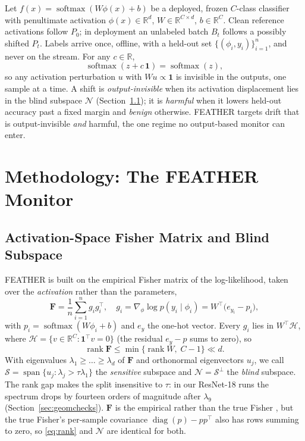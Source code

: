 \documentclass[conference]{IEEEtran}
\newcommand{\R}{\mathbb{R}}
\newcommand{\F}{\mathbf{F}}
\newcommand{\act}{\phi}
\DeclareMathOperator{\rank}{rank}
\DeclareMathOperator{\diag}{diag}
\DeclareMathOperator{\spn}{span}
\DeclareMathOperator*{\softmax}{softmax}
\begin{document}
Let $f(x) = \softmax(W\act(x) + b)$ be a deployed, frozen $C$-class
classifier with penultimate activation $\act(x) \in \R^d$,
$W \in \R^{C \times d}$, $b \in \R^C$. Clean reference activations follow
$P_0$; in deployment an unlabeled batch $B_t$ follows a possibly shifted
$P_t$. Labels arrive once, offline, with a held-out set
$\{(\act_i, y_i)\}_{i=1}^{n}$, and never on the stream. For any $c \in \R$,
\begin{equation}
  \softmax(z + c\,\mathbf{1}) = \softmax(z),
  \label{eq:invariance}
\end{equation}
so any activation perturbation $u$ with $Wu \propto \mathbf{1}$ is invisible
in the outputs, one sample at a time. A shift is \emph{output-invisible} when
its activation displacement lies in the blind subspace $\mathcal{N}$
(Section~\ref{sec:blind}); it is \emph{harmful} when it lowers held-out
accuracy past a fixed margin and \emph{benign} otherwise. FEATHER targets drift
that is output-invisible \emph{and} harmful, the one regime no output-based
monitor can enter.

\section{Methodology: The FEATHER Monitor}
\label{sec:method}

\subsection{Activation-Space Fisher Matrix and Blind Subspace}
\label{sec:blind}

FEATHER is built on the empirical Fisher matrix of the log-likelihood, taken
over the \emph{activation} rather than the parameters,
\begin{equation}
  \F = \frac{1}{n}\sum_{i=1}^{n} g_i g_i^\top,
  \quad
  g_i = \nabla_{\act}\log p(y_i \mid \act_i) = W^\top\!\big(e_{y_i} - p_i\big),
  \label{eq:fisher}
\end{equation}
with $p_i = \softmax(W\act_i + b)$ and $e_y$ the one-hot vector. Every $g_i$
lies in $W^\top\!\mathcal{H}$, where
$\mathcal{H} = \{v \in \R^C : \mathbf{1}^\top v = 0\}$ (the residual
$e_y - p$ sums to zero), so
\begin{equation}
  \rank \F \le \min\{\rank W,\; C-1\} \ll d .
  \label{eq:rank}
\end{equation}
With eigenvalues $\lambda_1 \ge \dots \ge \lambda_d$ of $\F$ and orthonormal
eigenvectors $u_j$, we call $\mathcal{S} = \spn\{u_j : \lambda_j >
\tau\lambda_1\}$ the \emph{sensitive} subspace and $\mathcal{N} =
\mathcal{S}^\perp$ the \emph{blind} subspace. The rank gap makes the split
insensitive to $\tau$: in our ResNet-18 runs the spectrum drops by fourteen
orders of magnitude after $\lambda_9$ (Section~\ref{sec:geomchecks}). $\F$ is
the empirical rather than the true Fisher \cite{kunstner2019empirical}, but the
true Fisher's per-sample covariance $\diag(p) - pp^\top$ also has rows summing
to zero, so \eqref{eq:rank} and $\mathcal{N}$ are identical for both.
\end{document}
